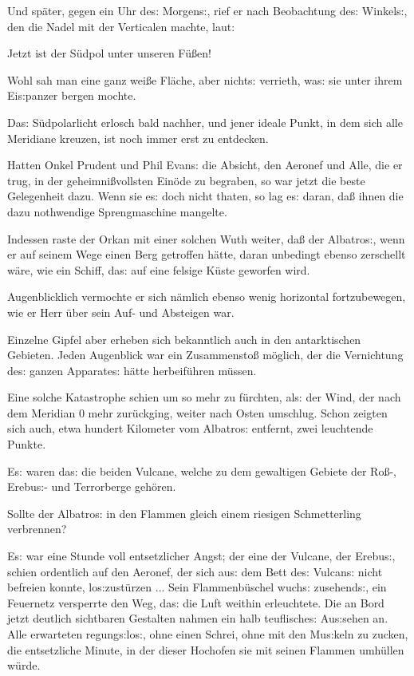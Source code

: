 \documentclass[oneside,12pt]{book}
\newcommand{\s}{s:}
\begin{document}
Und sp\"ater, gegen ein Uhr de{\s} Morgen{\s}, rief er nach
Beobachtung de{\s} Winkel{\s}, den die Nadel mit der Verticalen
machte, laut:

{\glqq}Jetzt ist der S\"udpol unter unseren F\"u{\ss}en!{\grqq}

Wohl sah man eine ganz wei{\ss}e Fl\"ache, aber nicht{\s} verrieth,
wa{\s} sie unter ihrem Ei{\s}panzer bergen mochte.

Da{\s} S\"udpolarlicht erlosch bald nachher, und jener ideale Punkt,
in dem sich alle Meridiane kreuzen, ist noch immer erst zu entdecken.

Hatten Onkel Prudent und Phil Evan{\s} die Absicht, den Aeronef und
Alle, die er trug, in der geheimni{\ss}vollsten Ein\"ode zu begraben,
so war jetzt die beste Gelegenheit dazu. Wenn sie e{\s} doch nicht
thaten, so lag e{\s} daran, da{\ss} ihnen die dazu nothwendige
Sprengmaschine mangelte.

Indessen raste der Orkan mit einer solchen Wuth weiter, da{\ss} der
{\glqq}Albatro{\s}{\grqq}, wenn er auf seinem Wege einen Berg
getroffen h\"atte, daran unbedingt ebenso zerschellt w\"are, wie ein
Schiff, da{\s} auf eine felsige K\"uste geworfen wird.

Augenblicklich vermochte er sich n\"amlich ebenso wenig horizontal
fort\/zubewegen, wie er Herr \"uber sein Auf- und Absteigen war.

Einzelne Gipfel aber erheben sich bekanntlich auch in den
antarktischen Gebieten. Jeden Augenblick war ein Zusammensto{\ss}
m\"oglich, der die Vernichtung de{\s} ganzen Apparate{\s} h\"atte
herbeif\"uhren m\"ussen.

Eine solche Katastrophe schien um so mehr zu f\"urchten, al{\s} der
Wind, der nach dem Meridian 0 mehr zur\"uckging, weiter nach Osten
umschlug. Schon zeigten sich auch, etwa hundert Kilometer vom
{\glqq}Albatro{\s}{\grqq} entfernt, zwei leuchtende Punkte.

E{\s} waren da{\s} die beiden Vulcane, welche zu dem gewaltigen
Gebiete der Ro{\ss}-, Erebu{\s}- und Terrorberge geh\"oren.

Sollte der {\glqq}Albatro{\s}{\grqq} in den Flammen gleich einem
riesigen Schmetterling verbrennen?

E{\s} war eine Stunde voll entsetzlicher Angst; der eine der Vulcane,
der Erebu{\s}, schien ordentlich auf den Aeronef, der sich au{\s} dem
Bett de{\s} Vulcan{\s} nicht befreien konnte, lo{\s}zust\"urzen ...
Sein Flammenb\"uschel wuch{\s} zusehend{\s}, ein Feuernetz versperrte
den Weg, da{\s} die Luft weithin erleuchtete. Die an Bord jetzt
deutlich sichtbaren Gestalten nahmen ein halb teuflische{\s}
Au{\s}sehen an. Alle erwarteten regung{\s}lo{\s}, ohne einen Schrei,
ohne mit den Mu{\s}keln zu zucken, die entsetzliche Minute, in der
dieser Hochofen sie mit seinen Flammen umh\"ullen w\"urde.
\end{document}
